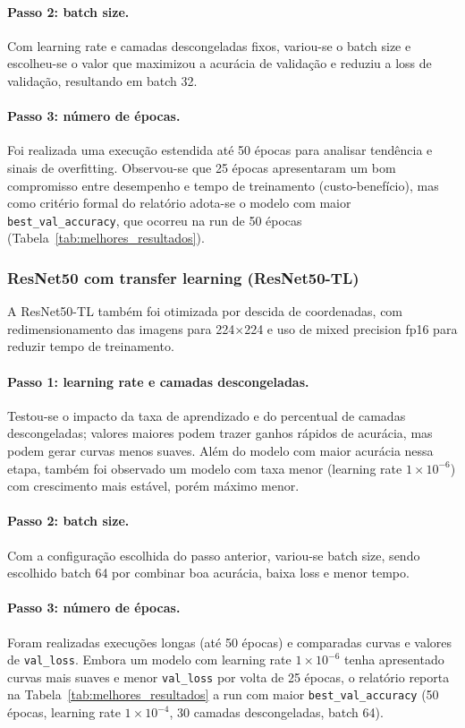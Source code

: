 \documentclass[12pt,a4paper]{article}
\begin{document}
\paragraph{Passo 2: batch size.}
Com learning rate e camadas descongeladas fixos, variou-se o batch size e escolheu-se o valor que maximizou a acurácia de validação e reduziu a loss de validação, resultando em batch 32.

\paragraph{Passo 3: número de épocas.}
Foi realizada uma execução estendida até 50 épocas para analisar tendência e sinais de overfitting.
Observou-se que 25 épocas apresentaram um bom compromisso entre desempenho e tempo de treinamento (custo-benefício), mas como critério formal do relatório adota-se o modelo com maior \texttt{best\_val\_accuracy}, que ocorreu na run de 50 épocas (Tabela~\ref{tab:melhores_resultados}).

\subsubsection{ResNet50 com transfer learning (ResNet50-TL)}
A ResNet50-TL também foi otimizada por descida de coordenadas, com redimensionamento das imagens para 224$\times$224 e uso de mixed precision fp16 para reduzir tempo de treinamento.

\paragraph{Passo 1: learning rate e camadas descongeladas.}
Testou-se o impacto da taxa de aprendizado e do percentual de camadas descongeladas; valores maiores podem trazer ganhos rápidos de acurácia, mas podem gerar curvas menos suaves.
Além do modelo com maior acurácia nessa etapa, também foi observado um modelo com taxa menor (learning rate $1 \times 10^{-6}$) com crescimento mais estável, porém máximo menor.

\paragraph{Passo 2: batch size.}
Com a configuração escolhida do passo anterior, variou-se batch size, sendo escolhido batch 64 por combinar boa acurácia, baixa loss e menor tempo.

\paragraph{Passo 3: número de épocas.}
Foram realizadas execuções longas (até 50 épocas) e comparadas curvas e valores de \texttt{val\_loss}.
Embora um modelo com learning rate $1 \times 10^{-6}$ tenha apresentado curvas mais suaves e menor \texttt{val\_loss} por volta de 25 épocas, o relatório reporta na Tabela~\ref{tab:melhores_resultados} a run com maior \texttt{best\_val\_accuracy} (50 épocas, learning rate $1 \times 10^{-4}$, 30 camadas descongeladas, batch 64).
\end{document}
